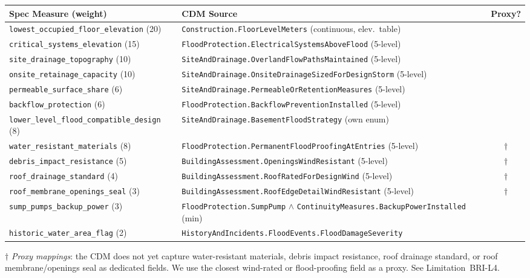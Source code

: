 \documentclass[11pt,a4paper]{article}
\begin{document}
\begin{center}
\small
\begin{tabular}{p{4.5cm}p{7cm}c}
    \toprule
    \textbf{Spec Measure (weight)} & \textbf{CDM Source} & \textbf{Proxy?} \\
    \midrule
    \texttt{lowest\_occupied\_floor\_elevation} (20) & \texttt{Construction.FloorLevelMeters} (continuous, elev.\ table) & \\
    \texttt{critical\_systems\_elevation} (15) & \texttt{FloodProtection.ElectricalSystemsAboveFlood} (5-level) & \\
    \texttt{site\_drainage\_topography} (10) & \texttt{SiteAndDrainage.OverlandFlowPathsMaintained} (5-level) & \\
    \texttt{onsite\_retainage\_capacity} (10) & \texttt{SiteAndDrainage.OnsiteDrainageSizedForDesignStorm} (5-level) & \\
    \texttt{permeable\_surface\_share} (6) & \texttt{SiteAndDrainage.PermeableOrRetentionMeasures} (5-level) & \\
    \texttt{backflow\_protection} (6) & \texttt{FloodProtection.BackflowPreventionInstalled} (5-level) & \\
    \texttt{lower\_level\_flood\_compatible\_design} (8) & \texttt{SiteAndDrainage.BasementFloodStrategy} (own enum) & \\
    \texttt{water\_resistant\_materials} (8) & \texttt{FloodProtection.PermanentFloodProofingAtEntries} (5-level) & $\dagger$ \\
    \texttt{debris\_impact\_resistance} (5) & \texttt{BuildingAssessment.OpeningsWindResistant} (5-level) & $\dagger$ \\
    \texttt{roof\_drainage\_standard} (4) & \texttt{BuildingAssessment.RoofRatedForDesignWind} (5-level) & $\dagger$ \\
    \texttt{roof\_membrane\_openings\_seal} (3) & \texttt{BuildingAssessment.RoofEdgeDetailWindResistant} (5-level) & $\dagger$ \\
    \texttt{sump\_pumps\_backup\_power} (3) & \texttt{FloodProtection.SumpPump} $\wedge$ \texttt{ContinuityMeasures.BackupPowerInstalled} (min) & \\
    \texttt{historic\_water\_area\_flag} (2) & \texttt{HistoryAndIncidents.FloodEvents.FloodDamageSeverity} & \\
    \bottomrule
\end{tabular}
\end{center}

\noindent $\dagger$ \textit{Proxy mappings}: the CDM does not yet capture
water-resistant materials, debris impact resistance, roof drainage standard, or roof
membrane/openings seal as dedicated fields. We use the closest wind-rated or
flood-proofing field as a proxy. See Limitation~BRI-L4.
\end{document}
